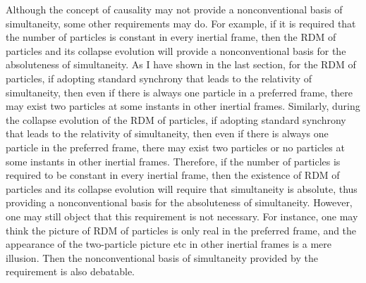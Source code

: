 Although the concept of causality may not provide a nonconventional basis of simultaneity, some other requirements may do.
For example, if it is required that the number of particles is constant in every inertial frame, then the RDM of particles and its collapse evolution will provide a nonconventional basis for the absoluteness of simultaneity.
As I have shown in the last section, for the RDM of particles, 
if adopting standard synchrony that leads to the relativity of simultaneity, 
then even if there is always one particle in a preferred frame, there may exist two particles at some instants in  other inertial frames.
Similarly, during the collapse evolution of the RDM of particles, if adopting standard synchrony that leads to the relativity of simultaneity, then even if there is always one particle in the preferred frame, there may exist two particles or no particles at some instants in other inertial frames.
Therefore, if the number of particles is required to be constant in every inertial frame, then the existence of RDM of particles and its collapse evolution will require that simultaneity is absolute, thus providing a nonconventional basis for the absoluteness of simultaneity.
However, one may still object that this requirement is not necessary. For instance, one may think the picture of RDM of particles is only real in the preferred frame, and the appearance of the two-particle picture etc in other inertial frames is a mere illusion. Then the nonconventional basis of simultaneity provided by the requirement is also debatable.

